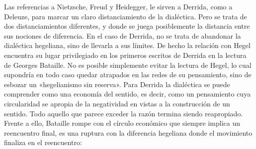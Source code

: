 Las referencias a Nietzsche, Freud y Heidegger, le sirven a Derrida, como a Deleuze, para marcar un claro distanciamiento de la dialéctica. Pero se trata de dos distanciamientos diferentes, y donde se juega posiblemente la distancia entre sus nociones de diferencia. En el caso de Derrida, no se trata de abandonar la dialéctica hegeliana, sino de llevarla a sus límites. De hecho la relación con Hegel encuentra su lugar privilegiado en los primeros escritos de Derrida en la lectura de Georges Bataille. No es posible simplemente evitar la lectura de Hegel, lo cual supondría en todo caso quedar atrapados en las redes de su pensamiento, sino de esbozar un «hegelianismo sin reserva». Para Derrida la dialéctica se puede comprender como una economía del sentido, es decir, como un pensamiento cuya circularidad se apropia de la negatividad en vistas a la construcción de un sentido. Todo aquello que parece exceder la razón termina siendo reapropiado. Frente a ello, Bataille rompe con el círculo económico que siempre implica un reencuentro final, es una ruptura con la diferencia hegeliana donde el movimiento finaliza en el reencuentro:

